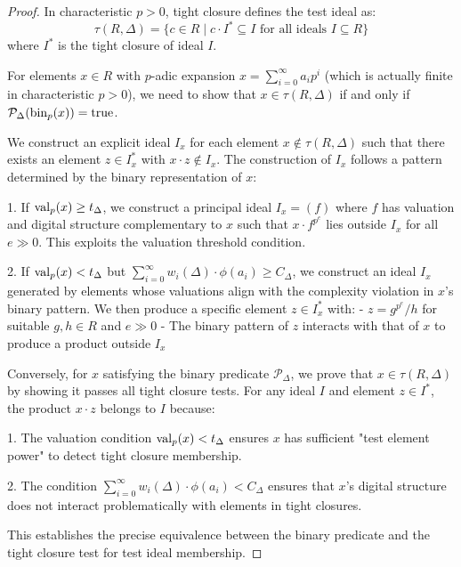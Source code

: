 \begin{proof}
In characteristic $p > 0$, tight closure defines the test ideal as:
$$\tau(R,\Delta) = \{c \in R \mid c \cdot I^* \subseteq I \text{ for all ideals } I \subseteq R\}$$
where $I^*$ is the tight closure of ideal $I$.

For elements $x \in R$ with $p$-adic expansion $x = \sum_{i=0}^{\infty} a_i p^i$ (which is actually finite in characteristic $p > 0$), we need to show that $x \in \tau(R,\Delta)$ if and only if $\mathcal{P}_\Delta(\operatorname{bin}_p(x)) = \text{true}$.

We construct an explicit ideal $I_x$ for each element $x \not\in \tau(R,\Delta)$ such that there exists an element $z \in I_x^*$ with $x \cdot z \not\in I_x$. The construction of $I_x$ follows a pattern determined by the binary representation of $x$:

1. If $\operatorname{val}_p(x) \geq t_\Delta$, we construct a principal ideal $I_x = (f)$ where $f$ has valuation and digital structure complementary to $x$ such that $x \cdot f^{p^e}$ lies outside $I_x$ for all $e \gg 0$. This exploits the valuation threshold condition.

2. If $\operatorname{val}_p(x) < t_\Delta$ but $\sum_{i=0}^{\infty} w_i(\Delta) \cdot \phi(a_i) \geq C_\Delta$, we construct an ideal $I_x$ generated by elements whose valuations align with the complexity violation in $x$'s binary pattern. We then produce a specific element $z \in I_x^*$ with:
   - $z = g^{p^e}/h$ for suitable $g,h \in R$ and $e \gg 0$
   - The binary pattern of $z$ interacts with that of $x$ to produce a product outside $I_x$

Conversely, for $x$ satisfying the binary predicate $\mathcal{P}_\Delta$, we prove that $x \in \tau(R,\Delta)$ by showing it passes all tight closure tests. For any ideal $I$ and element $z \in I^*$, the product $x \cdot z$ belongs to $I$ because:

1. The valuation condition $\operatorname{val}_p(x) < t_\Delta$ ensures $x$ has sufficient "test element power" to detect tight closure membership.

2. The condition $\sum_{i=0}^{\infty} w_i(\Delta) \cdot \phi(a_i) < C_\Delta$ ensures that $x$'s digital structure does not interact problematically with elements in tight closures.

This establishes the precise equivalence between the binary predicate and the tight closure test for test ideal membership.
\end{proof}

